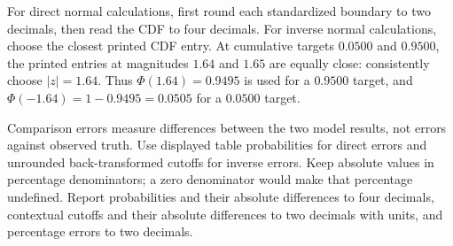 For direct normal calculations, first round each standardized boundary to two decimals, then read the CDF to four decimals. For inverse normal calculations, choose the closest printed CDF entry. At cumulative targets $0.0500$ and $0.9500$, the printed entries at magnitudes $1.64$ and $1.65$ are equally close: consistently choose $|z|=1.64$. Thus $\Phi(1.64)=0.9495$ is used for a $0.9500$ target, and $\Phi(-1.64)=1-0.9495=0.0505$ for a $0.0500$ target.

Comparison errors measure differences between the two model results, not errors against observed truth. Use displayed table probabilities for direct errors and unrounded back-transformed cutoffs for inverse errors. Keep absolute values in percentage denominators; a zero denominator would make that percentage undefined. Report probabilities and their absolute differences to four decimals, contextual cutoffs and their absolute differences to two decimals with units, and percentage errors to two decimals.
\begingroup
